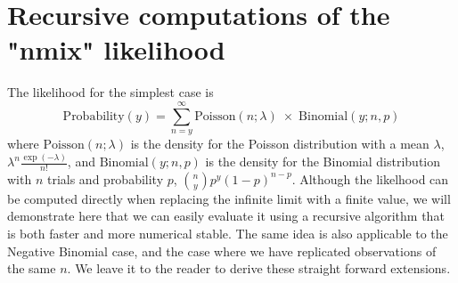 \documentclass{article}
\begin{document}
\section{Recursive computations of the "nmix" likelihood}
The likelihood for the simplest case is
\begin{displaymath}
\text{Probability}(y) = \sum_{n = y}^{\infty}
\text{Poisson}(n ; \lambda) \;\times\; \text{Binomial}(y;  n, p)
\end{displaymath}
where $\text{Poisson}(n; \lambda)$ is the density for the Poisson distribution with a mean $\lambda$, $\lambda^{n}\frac{\exp(-\lambda)}{n!}$, and $\text{Binomial}(y; n, p)$ is the density for the Binomial distribution with $n$ trials and probability $p$, ${n \choose y} p^{y}(1-p)^{n-p}$. Although the likelhood can be computed directly when replacing the infinite limit with a finite value, we will demonstrate here that we can easily evaluate it using a recursive algorithm that is both faster and more numerical stable. The same idea is also applicable to the Negative Binomial case, and the case where we have replicated observations of the same $n$. We leave it to the reader to derive these straight forward extensions.
\end{document}

